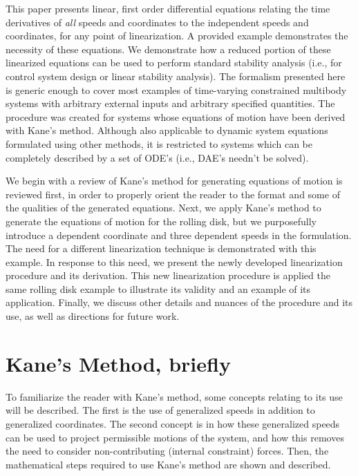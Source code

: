 \documentclass[smallcondensed,final]{svjour3}                     %
\begin{document}
This paper presents linear, first order differential equations relating the
time derivatives of \textit{all} speeds and coordinates to the independent
speeds and coordinates, for any point of linearization.  A provided example
demonstrates the necessity of these equations.  We demonstrate how a reduced
portion of these linearized equations can be used to perform standard stability
analysis (i.e., for control system design or linear stability analysis).  The
formalism presented here is generic enough to cover most examples of
time-varying constrained multibody systems with arbitrary external inputs and
arbitrary specified quantities.
The procedure was created for systems whose equations of motion have been
derived with Kane's method. Although also applicable to dynamic system
equations formulated using other methods, it is restricted to systems which can
be completely described by a set of ODE's (i.e., DAE's needn't be solved).

We begin with a review of Kane's method for generating equations of motion is
reviewed first, in order to properly orient the reader to the format and some
of the qualities of the generated equations. Next, we apply Kane's method to
generate the equations of motion for the rolling disk, but we purposefully
introduce a dependent coordinate and three dependent speeds in the formulation.
The need for a different linearization technique is demonstrated with this
example. In response to this need, we present the newly developed linearization
procedure and its derivation. This new linearization procedure is applied the
same rolling disk example to illustrate its validity and an example of its
application. Finally, we discuss other details and nuances of the procedure and
its use, as well as directions for future work.

\section{Kane's Method, briefly}
\label{sec:kane_method}
To familiarize the reader with Kane's method, some concepts relating to its use
will be described.  The first is the use of generalized speeds in addition to
generalized coordinates.  The second concept is in how these generalized speeds
can be used to project permissible motions of the system, and how this removes
the need to consider non-contributing (internal constraint) forces.  Then, the
mathematical steps required to use Kane's method are shown and described.
\end{document}
